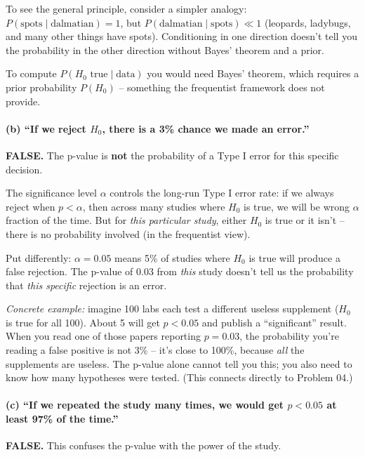\documentclass[11pt]{article}
\begin{document}
To see the general principle, consider a simpler analogy: $P(\text{spots} \mid \text{dalmatian}) = 1$, but $P(\text{dalmatian} \mid \text{spots}) \ll 1$ (leopards, ladybugs, and many other things have spots). Conditioning in one direction doesn't tell you the probability in the other direction without Bayes' theorem and a prior.

To compute $P(H_0 \text{ true} \mid \text{data})$ you would need Bayes' theorem, which requires a prior probability $P(H_0)$ -- something the frequentist framework does not provide.

\paragraph{(b) ``If we reject $H_0$, there is a 3\% chance we made an error.''}

\textbf{FALSE.} The p-value is \textbf{not} the probability of a Type I error for this specific decision.

The significance level $\alpha$ controls the long-run Type I error rate: if we always reject when $p < \alpha$, then across many studies where $H_0$ is true, we will be wrong $\alpha$ fraction of the time. But for \textit{this particular study}, either $H_0$ is true or it isn't -- there is no probability involved (in the frequentist view).

Put differently: $\alpha = 0.05$ means 5\% of studies where $H_0$ is true will produce a false rejection. The p-value of 0.03 from \textit{this} study doesn't tell us the probability that \textit{this specific} rejection is an error.

\textit{Concrete example:} imagine 100 labs each test a different useless supplement ($H_0$ is true for all 100). About 5 will get $p < 0.05$ and publish a ``significant'' result. When you read one of those papers reporting $p = 0.03$, the probability you're reading a false positive is not 3\% -- it's close to 100\%, because \textit{all} the supplements are useless. The p-value alone cannot tell you this; you also need to know how many hypotheses were tested. (This connects directly to Problem 04.)

\paragraph{(c) ``If we repeated the study many times, we would get $p < 0.05$ at least 97\% of the time.''}

\textbf{FALSE.} This confuses the p-value with the power of the study.
\end{document}
